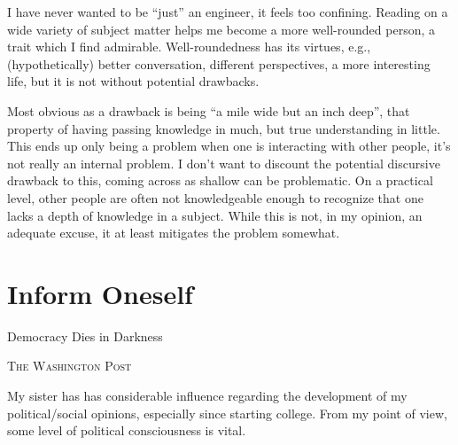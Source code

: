 \documentclass[../philo.tex]{subfiles}
\begin{document}
I have never wanted to be ``just'' an engineer, it feels too confining.
Reading on a wide variety of subject matter helps me become a more well-rounded person, a trait which I find admirable.
Well-roundedness has its virtues, e.g., (hypothetically) better conversation, different perspectives, a more interesting life, but it is not without potential drawbacks.

Most obvious as a drawback is being ``a mile wide but an inch deep'', that property of having passing knowledge in much, but true understanding in little.
This ends up only being a problem when one is interacting with other people, it's not really an internal problem.
I don't want to discount the potential discursive drawback to this, coming across as shallow can be problematic.
On a practical level, other people are often not knowledgeable enough to recognize that one lacks a depth of knowledge in a subject.
While this is not, in my opinion, an adequate excuse, it at least mitigates the problem somewhat.

\section{Inform Oneself}
\epigraph{Democracy Dies in Darkness}{\textsc{The Washington Post}}
My sister has has considerable influence regarding the development of my political/social opinions, especially since starting college.
From my point of view, some level of political consciousness is vital.
\end{document}
